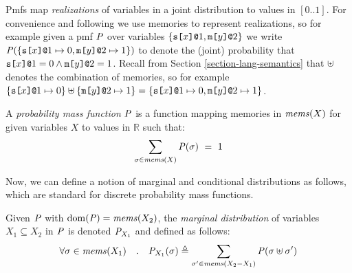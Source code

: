 Pmfs map \emph{realizations} of variables in a joint
distribution to values in $[0..1]$. For convenience and following
\cite{barthe2019probabilistic,skalka-near-ppdp24} we use memories to
represent realizations, so for example given a pmf $\mathit{P}$ over
variables $\{ \texttt{s[}x\texttt{]}\texttt{@}1, \texttt{m[}y\texttt{]}\texttt{@}2 \}$ we write $\mathit{P}(\{
\texttt{s[}x\texttt{]}\texttt{@}1 \mapsto 0, \texttt{m[}y\texttt{]}\texttt{@}2 \mapsto 1 \})$ to
denote the (joint) probability that $\texttt{s[}x\texttt{]}\texttt{@}1 = 0 \wedge
\texttt{m[}y\texttt{]}\texttt{@}2 = 1$. Recall from Section
\ref{section-lang-semantics} that $\uplus$ denotes the combination of
memories, so for example $\{ \texttt{s[}x\texttt{]}\texttt{@}1 \mapsto 0\} \uplus
\{\texttt{m[}y\texttt{]}\texttt{@}2 \mapsto 1 \} = \{ \texttt{s[}x\texttt{]}\texttt{@}1 \mapsto 0,
\texttt{m[}y\texttt{]}\texttt{@}2 \mapsto 1 \}$.
\begin{definition}
  A \emph{probability mass function} $\mathit{P}$ is a function
  mapping memories in $\mathit{mems}(X)$ for given variables $X$ to
  values in $\mathbb{R}$ such that:
  $$
  \sum_{\sigma \in \mathit{mems}(X)} \mathit{P}(\sigma) \  = \ 1
  $$
\end{definition}
Now, we can define a notion of marginal and conditional
distributions as follows, which are standard for discrete
probability mass functions. 
\begin{definition}
  Given $\mathit{P}$ with $\mathrm{dom}(\mathit{P}) = \mathit{mems}(X_2)$, the \emph{marginal distribution}
  of variables $X_1 \subseteq X_2$ in $\mathit{P}$ is denoted ${\mathit{P}}_{X_1}$ and defined as follows:
  $$
  \forall \sigma \in \mathit{mems}(X_1) \quad . \quad {\mathit{P}}_{X_1}(\sigma) \triangleq
  \sum_{\sigma' \in \mathit{mems}(X_2-X_1)} \mathit{P}(\sigma \uplus \sigma')
  $$
\end{definition}

